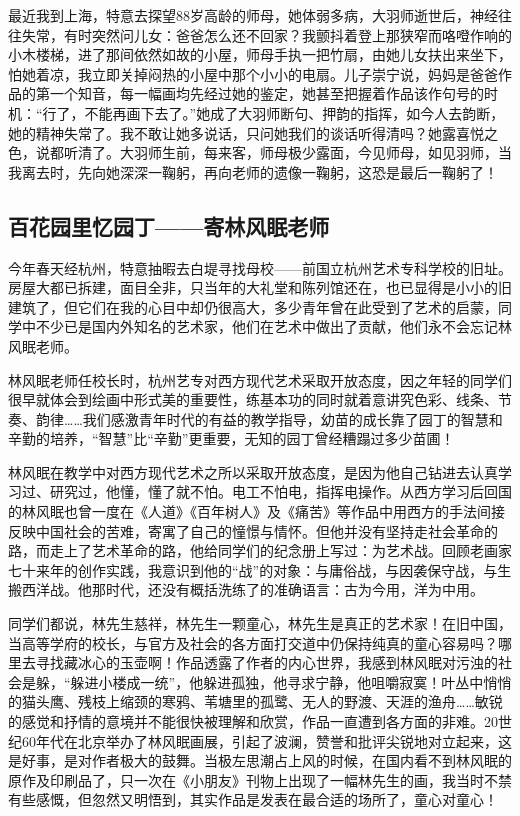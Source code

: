 \documentclass{article}
\begin{document}
最近我到上海，特意去探望88岁高龄的师母，她体弱多病，大羽师逝世后，神经往往失常，有时突然问儿女：爸爸怎么还不回家？我颤抖着登上那狭窄而咯噔作响的小木楼梯，进了那间依然如故的小屋，师母手执一把竹扇，由她儿女扶出来坐下，怕她着凉，我立即关掉闷热的小屋中那个小小的电扇。儿子崇宁说，妈妈是爸爸作品的第一个知音，每一幅画均先经过她的鉴定，她甚至把握着作品该作句号的时机：“行了，不能再画下去了。”她成了大羽师断句、押韵的指挥，如今人去韵断，她的精神失常了。我不敢让她多说话，只问她我们的谈话听得清吗？她露喜悦之色，说都听清了。大羽师生前，每来客，师母极少露面，今见师母，如见羽师，当我离去时，先向她深深一鞠躬，再向老师的遗像一鞠躬，这恐是最后一鞠躬了！
\subsection{百花园里忆园丁——寄林风眠老师}
今年春天经杭州，特意抽暇去白堤寻找母校——前国立杭州艺术专科学校的旧址。房屋大都已拆建，面目全非，只当年的大礼堂和陈列馆还在，也已显得是小小的旧建筑了，但它们在我的心目中却仍很高大，多少青年曾在此受到了艺术的启蒙，同学中不少已是国内外知名的艺术家，他们在艺术中做出了贡献，他们永不会忘记林风眠老师。

林风眠老师任校长时，杭州艺专对西方现代艺术采取开放态度，因之年轻的同学们很早就体会到绘画中形式美的重要性，练基本功的同时就着意讲究色彩、线条、节奏、韵律……我们感激青年时代的有益的教学指导，幼苗的成长靠了园丁的智慧和辛勤的培养，“智慧”比“辛勤”更重要，无知的园丁曾经糟蹋过多少苗圃！

林风眠在教学中对西方现代艺术之所以采取开放态度，是因为他自己钻进去认真学习过、研究过，他懂，懂了就不怕。电工不怕电，指挥电操作。从西方学习后回国的林风眠也曾一度在《人道》《百年树人》及《痛苦》等作品中用西方的手法间接反映中国社会的苦难，寄寓了自己的憧憬与情怀。但他并没有坚持走社会革命的路，而走上了艺术革命的路，他给同学们的纪念册上写过：为艺术战。回顾老画家七十来年的创作实践，我意识到他的“战”的对象：与庸俗战，与因袭保守战，与生搬西洋战。他那时代，还没有概括洗练了的准确语言：古为今用，洋为中用。

同学们都说，林先生慈祥，林先生一颗童心，林先生是真正的艺术家！在旧中国，当高等学府的校长，与官方及社会的各方面打交道中仍保持纯真的童心容易吗？哪里去寻找藏冰心的玉壶啊！作品透露了作者的内心世界，我感到林风眠对污浊的社会是躲，“躲进小楼成一统”，他躲进孤独，他寻求宁静，他咀嚼寂寞！叶丛中悄悄的猫头鹰、残枝上缩颈的寒鸦、苇塘里的孤鹭、无人的野渡、天涯的渔舟……敏锐的感觉和抒情的意境并不能很快被理解和欣赏，作品一直遭到各方面的非难。20世纪60年代在北京举办了林风眠画展，引起了波澜，赞誉和批评尖锐地对立起来，这是好事，是对作者极大的鼓舞。当极左思潮占上风的时候，在国内看不到林风眠的原作及印刷品了，只一次在《小朋友》刊物上出现了一幅林先生的画，我当时不禁有些感慨，但忽然又明悟到，其实作品是发表在最合适的场所了，童心对童心！
\end{document}
